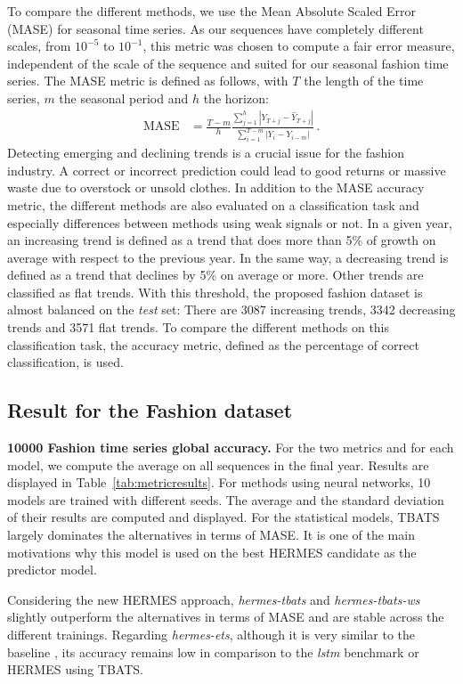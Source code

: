 \documentclass[10pt]{article} %
\begin{document}
To compare the different methods, we use the Mean Absolute Scaled Error (MASE) for seasonal time series. As our sequences have completely different scales, from $10^{-5}$ to $10^{-1}$, this metric was chosen to compute a fair error measure, independent of the scale of the sequence and suited for our seasonal fashion time series. The MASE metric is defined as follows, with $T$ the length of the time series, $m$ the seasonal period and $h$ the horizon:
\begin{align*}
\mathrm{MASE} &= \frac{T-m}{h}\frac{\sum_{j=1}^h |Y_{T+j} - \hat{Y}_{T+j}| }{\sum_{i=1}^{T-m} |Y_i - Y_{i-m}|}\,.
\end{align*}
Detecting emerging and declining trends is a crucial issue for the fashion industry. A correct or incorrect prediction could lead to good returns or massive waste due to overstock or unsold clothes. In addition to the MASE accuracy metric, the different methods are also evaluated on a classification task and especially differences between methods using weak signals or not. In a given year, an increasing trend is defined as a trend that does more than 5\% of growth on average with respect to the previous year. In the same way, a decreasing trend is defined as a trend that declines by 5\% on average or more. Other trends are classified as flat trends. With this threshold, the proposed fashion dataset is almost balanced on the {\em test} set: There are 3087 increasing trends, 3342 decreasing trends and 3571 flat trends. To compare the different methods on this classification task, the accuracy metric, defined as the percentage of correct classification, is used.


\subsection{Result for the Fashion dataset}

\textbf{10000 Fashion time series global accuracy. }For the two metrics and for each model, we compute the average on all sequences in the final year. Results are displayed in Table~\ref{tab:metricresults}. For methods using neural networks, 10 models are trained  with different seeds. The average and the standard deviation of their results are computed and displayed. For the statistical models, TBATS largely dominates the alternatives in terms of MASE. It is one of the main motivations why this model is used on the best HERMES candidate as the predictor model. 

Considering the new HERMES approach, \textit{hermes-tbats} and \textit{hermes-tbats-ws} slightly outperform the alternatives in terms of MASE and are stable across the different trainings. Regarding \textit{hermes-ets},   although it is very similar to the baseline \citet{smyl2020}, its accuracy remains low in comparison to the \textit{lstm} benchmark or HERMES using TBATS. 
\end{document}
